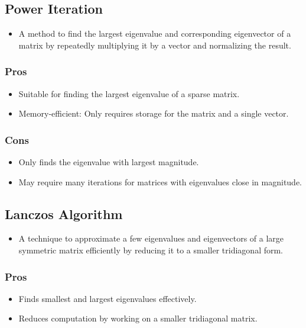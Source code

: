 \documentclass[journal]{IEEEtran}
\begin{document}
\subsection{Power Iteration}
\begin{itemize}
    \item A method to find the largest eigenvalue and corresponding eigenvector of a matrix by repeatedly multiplying it by a vector and normalizing the result.\\
\end{itemize}
\subsubsection{Pros}
\begin{itemize}
    \item Suitable for finding the largest eigenvalue of a sparse matrix.
    \item Memory-efficient: Only requires storage for the matrix and a single vector.
\end{itemize}
\subsubsection{Cons}
\begin{itemize}
    \item Only finds the eigenvalue with largest magnitude.
    \item May require many iterations for matrices with eigenvalues close in magnitude.
    
\end{itemize}
\subsection{Lanczos Algorithm}
\begin{itemize}
    \item A technique to approximate a few eigenvalues and eigenvectors of a large symmetric matrix efficiently by reducing it to a smaller tridiagonal form.\\
\end{itemize}
\subsubsection{Pros}
\begin{itemize}
    \item Finds smallest and largest eigenvalues effectively.
    \item Reduces computation by working on a smaller tridiagonal matrix.
\end{itemize}
\end{document}
